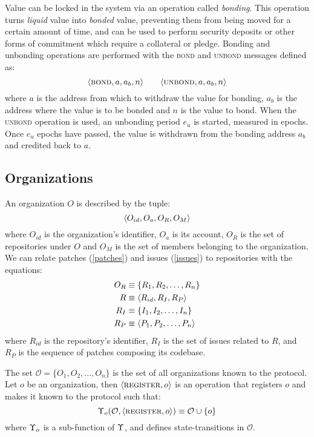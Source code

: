 Value can be locked in the system via an operation called \emph{bonding}.
This operation turns \emph{liquid} value into \emph{bonded} value, preventing
them from being moved for a certain amount of time, and can be used to perform
security deposits or other forms of commitment which require a collateral or
pledge. Bonding and unbonding operations are performed with the
\textsc{bond} and \textsc{unbond} messages defined as:
\[
    \tx{bond}{a, a_b, n} \qquad \tx{unbond}{a, a_b, n}
    \medskip
\]
where $a$ is the address from which to withdraw the value for bonding, $a_b$ is
the address where the value is to be bonded and $n$ is the value to bond. When
the \textsc{unbond} operation is used, an unbonding period $e_u$ is started,
measured in epochs. Once $e_{u}$ epochs have passed, the value is withdrawn
from the bonding address $a_b$ and credited back to $a$.

\subsection{Organizations}
\label{orgs}

An organization $O$ is described by the tuple:
\[
    \langle O_{id}, O_{a}, O_R, O_M \rangle
\]
where $O_{id}$ is the organization's identifier, $O_a$ is its account, $O_R$ is
the set of repositories under $O$ and $O_M$ is the set of members belonging to
the organization. We can relate patches (\ref{patches}) and issues
(\ref{issues}) to repositories with the equations:
\begin{align*}
    O_R & \equiv \{R_1, R_2, \dotsc, R_n\}         \\
    R   & \equiv \langle R_{id}, R_I, R_P \rangle         \\
    R_I & \equiv \{I_1, I_2, \dotsc, I_n\}         \\
    R_P & \equiv \langle P_1, P_2, \dotsc, P_n \rangle
\end{align*}
where $R_{id}$ is the repository's identifier, $R_I$ is the set of issues
related to $R$, and $R_P$ is the sequence of patches composing its codebase.

The set $\mathcal{O} = \{O_1, O_2, \dotsc, O_n\}$ is the set of all organizations
known to the protocol.  Let $o$ be an organization, then $\langle \text{\normalfont\scshape register}, o \rangle$ is
an operation that registers $o$ and makes it known to the protocol such that:
\[
    \Upsilon_o(\mathcal{O}, \langle \text{\normalfont\scshape register}, o \rangle)
    \equiv \mathcal{O} \cup \{o\}
\]
where $\Upsilon_o$ is a sub-function of $\Upsilon$, and defines
state-transitions in $\mathcal{O}$.

